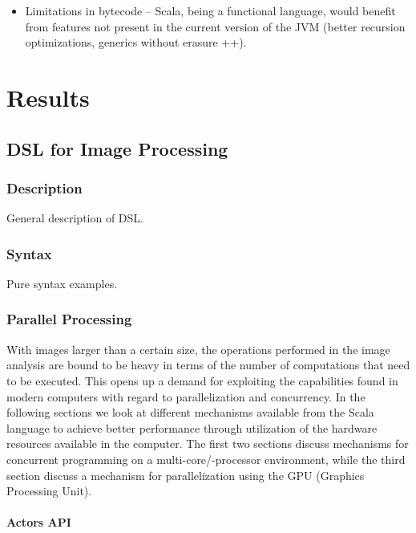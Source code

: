 \documentclass[a4paper,english]{report}
\begin{document}
\begin{itemize}
\item Limitations in bytecode -- Scala, being a functional language,
  would benefit from features not present in the current version of
  the JVM (better recursion optimizations, generics without erasure
  ++).
\end{itemize}

\chapter{Results}

\section{DSL for Image Processing}

\subsection{Description}

General description of DSL.

\subsection{Syntax}

Pure syntax examples.

\subsection{Parallel Processing}

With images larger than a certain size, the operations performed in
the image analysis are bound to be heavy in terms of the number of
computations that need to be executed. This opens up a demand for
exploiting the capabilities found in modern computers with regard to
parallelization and concurrency. In the following sections we look at
different mechanisms available from the Scala language to achieve
better performance through utilization of the hardware resources
available in the computer. The first two sections discuss mechanisms
for concurrent programming on a multi-core/-processor environment,
while the third section discuss a mechanism for parallelization using
the GPU (Graphics Processing Unit).

\subsubsection{Actors API}
\label{sec:actors}
\end{document}
